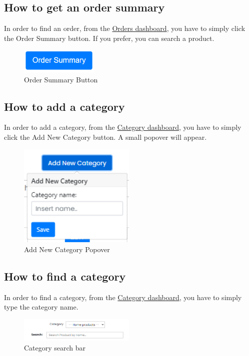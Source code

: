 \subsection{How to get an order summary}\label{_orderSummary}
In order to find an order, from the \hyperref[_ordermanagement]{Orders dashboard}, you have to simply click the Order Summary button. If you prefer, you can search a product.
\begin{figure}[H]
    \centering
    \includegraphics[width=10em]{res/images/venditore/ordersummarybutton.png}
    \caption{Order Summary Button}
\end{figure}

\subsection{How to add a category}\label{_addCategory}
In order to add a category, from the \hyperref[_categorymanagement]{Category dashboard}, you have to simply click the Add New Category button.
A small popover will appear.
\begin{figure}[H]
    \centering
    \includegraphics[width=15em]{res/images/venditore/addcategory.png}
    \caption{Add New Category Popover}
\end{figure}

\subsection{How to find a category}\label{_findCategory}
In order to find a category, from the \hyperref[_categorymanagement]{Category dashboard}, you have to simply type the category name.
\begin{figure}[H]
    \centering
    \includegraphics[width=15em]{res/images/venditore/categoryandsearchbar.png}
    \caption{Category search bar}
\end{figure}

